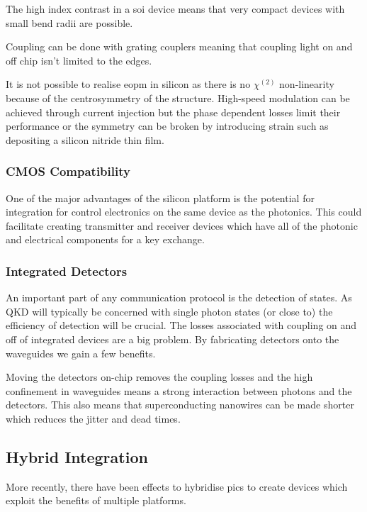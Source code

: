 The high index contrast in a \ac{soi} device means that very compact devices with small bend radii are possible.

Coupling can be done with grating couplers meaning that coupling light on and off chip isn't limited to the edges.

It is not possible to realise \ac{eopm} in silicon as there is no $\chi^{(2)}$ non-linearity because of the centrosymmetry of the structure. High-speed modulation can be achieved through current injection but the phase dependent losses limit their performance \cite{} or the symmetry can be broken by introducing strain such as depositing a silicon nitride thin film.

\subsubsection*{CMOS Compatibility}

One of the major advantages of the silicon platform is the potential for integration for control electronics on the same device as the photonics. This could facilitate creating transmitter and receiver devices which have all of the photonic and electrical components for a key exchange. 

\subsubsection*{Integrated Detectors}

An important part of any communication protocol is the detection of states. As \ac{QKD} will typically be concerned with single photon states (or close to) the efficiency of detection will be crucial. The losses associated with coupling on and off of integrated devices are a big problem. By fabricating detectors onto the waveguides we gain a few benefits.

Moving the detectors on-chip removes the coupling losses and the high confinement in waveguides means a strong interaction between photons and the detectors. This also means that superconducting nanowires can be made shorter which reduces the jitter and dead times.

\subsection{Hybrid Integration}

More recently, there have been effects to hybridise \acp{pic} to create devices which exploit the benefits of multiple platforms. 

